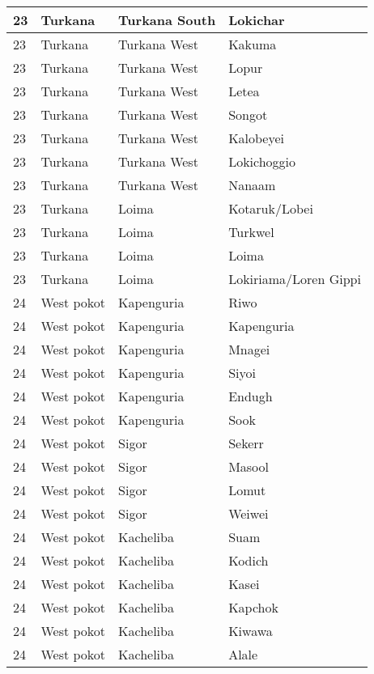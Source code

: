 \begin{table}[!ht]
\begin{tabular}{|l|l|l|l|}
        23 & Turkana & Turkana South & Lokichar \\ \hline
        23 & Turkana & Turkana West & Kakuma \\ \hline
        23 & Turkana & Turkana West & Lopur \\ \hline
        23 & Turkana & Turkana West & Letea \\ \hline
        23 & Turkana & Turkana West & Songot \\ \hline
        23 & Turkana & Turkana West & Kalobeyei \\ \hline
        23 & Turkana & Turkana West & Lokichoggio \\ \hline
        23 & Turkana & Turkana West & Nanaam \\ \hline
        23 & Turkana & Loima & Kotaruk/Lobei \\ \hline
        23 & Turkana & Loima & Turkwel \\ \hline
        23 & Turkana & Loima & Loima \\ \hline
        23 & Turkana & Loima & Lokiriama/Loren Gippi \\ \hline
        24 & West pokot & Kapenguria & Riwo \\ \hline
        24 & West pokot & Kapenguria & Kapenguria \\ \hline
        24 & West pokot & Kapenguria & Mnagei \\ \hline
        24 & West pokot & Kapenguria & Siyoi \\ \hline
        24 & West pokot & Kapenguria & Endugh \\ \hline
        24 & West pokot & Kapenguria & Sook \\ \hline
        24 & West pokot & Sigor & Sekerr \\ \hline
        24 & West pokot & Sigor & Masool \\ \hline
        24 & West pokot & Sigor & Lomut \\ \hline
        24 & West pokot & Sigor & Weiwei \\ \hline
        24 & West pokot & Kacheliba & Suam \\ \hline
        24 & West pokot & Kacheliba & Kodich \\ \hline
        24 & West pokot & Kacheliba & Kasei \\ \hline
        24 & West pokot & Kacheliba & Kapchok \\ \hline
        24 & West pokot & Kacheliba & Kiwawa \\ \hline
        24 & West pokot & Kacheliba & Alale \\ \hline

\end{tabular}
\end{table}
